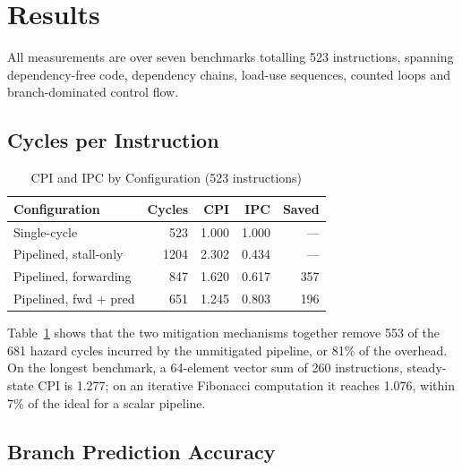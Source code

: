 \documentclass[conference]{IEEEtran}
\begin{document}
\section{Results}

All measurements are over seven benchmarks totalling 523 instructions,
spanning dependency-free code, dependency chains, load-use sequences,
counted loops and branch-dominated control flow.

\subsection{Cycles per Instruction}

\begin{table}[htbp]
\caption{CPI and IPC by Configuration (523 instructions)}
\begin{center}
\begin{tabular}{lrrrr}
\toprule
\textbf{Configuration} & \textbf{Cycles} & \textbf{CPI} & \textbf{IPC} & \textbf{Saved} \\
\midrule
Single-cycle          & 523  & 1.000 & 1.000 & --- \\
Pipelined, stall-only & 1204 & 2.302 & 0.434 & --- \\
Pipelined, forwarding & 847  & 1.620 & 0.617 & 357 \\
Pipelined, fwd + pred & 651  & 1.245 & 0.803 & 196 \\
\bottomrule
\end{tabular}
\label{tab:cpi}
\end{center}
\end{table}

Table~\ref{tab:cpi} shows that the two mitigation mechanisms together
remove 553 of the 681 hazard cycles incurred by the unmitigated pipeline,
or 81\% of the overhead. On the longest benchmark, a 64-element vector sum
of 260 instructions, steady-state CPI is 1.277; on an iterative Fibonacci
computation it reaches 1.076, within 7\% of the ideal for a scalar
pipeline.

\subsection{Branch Prediction Accuracy}
\end{document}
